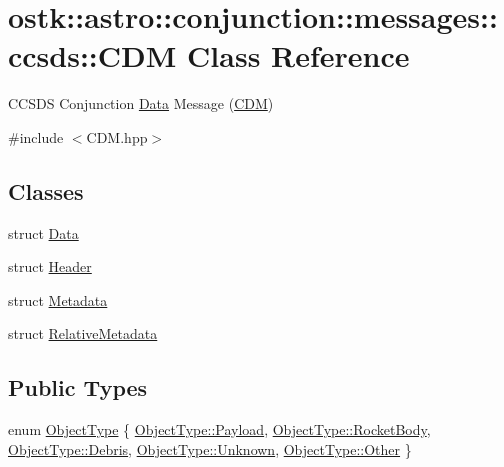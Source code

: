 \hypertarget{classostk_1_1astro_1_1conjunction_1_1messages_1_1ccsds_1_1_c_d_m}{}\section{ostk\+:\+:astro\+:\+:conjunction\+:\+:messages\+:\+:ccsds\+:\+:C\+DM Class Reference}
\label{classostk_1_1astro_1_1conjunction_1_1messages_1_1ccsds_1_1_c_d_m}


C\+C\+S\+DS Conjunction \hyperlink{structostk_1_1astro_1_1conjunction_1_1messages_1_1ccsds_1_1_c_d_m_1_1_data}{Data} Message (\hyperlink{classostk_1_1astro_1_1conjunction_1_1messages_1_1ccsds_1_1_c_d_m}{C\+DM})  




{\ttfamily \#include $<$C\+D\+M.\+hpp$>$}

\subsection*{Classes}
\begin{DoxyCompactItemize}
\item 
struct \hyperlink{structostk_1_1astro_1_1conjunction_1_1messages_1_1ccsds_1_1_c_d_m_1_1_data}{Data}
\item 
struct \hyperlink{structostk_1_1astro_1_1conjunction_1_1messages_1_1ccsds_1_1_c_d_m_1_1_header}{Header}
\item 
struct \hyperlink{structostk_1_1astro_1_1conjunction_1_1messages_1_1ccsds_1_1_c_d_m_1_1_metadata}{Metadata}
\item 
struct \hyperlink{structostk_1_1astro_1_1conjunction_1_1messages_1_1ccsds_1_1_c_d_m_1_1_relative_metadata}{Relative\+Metadata}
\end{DoxyCompactItemize}
\subsection*{Public Types}
\begin{DoxyCompactItemize}
\item 
enum \hyperlink{classostk_1_1astro_1_1conjunction_1_1messages_1_1ccsds_1_1_c_d_m_a9ef446f2327904fc0516249120ec9d71}{Object\+Type} \{ \newline
\hyperlink{classostk_1_1astro_1_1conjunction_1_1messages_1_1ccsds_1_1_c_d_m_a9ef446f2327904fc0516249120ec9d71a00f4e5788aab6d3546bb433842dbbefc}{Object\+Type\+::\+Payload}, 
\hyperlink{classostk_1_1astro_1_1conjunction_1_1messages_1_1ccsds_1_1_c_d_m_a9ef446f2327904fc0516249120ec9d71adbf0f8cc46650179a9710985f21747b4}{Object\+Type\+::\+Rocket\+Body}, 
\hyperlink{classostk_1_1astro_1_1conjunction_1_1messages_1_1ccsds_1_1_c_d_m_a9ef446f2327904fc0516249120ec9d71a7e4a693bfe182987626f234139a8dc83}{Object\+Type\+::\+Debris}, 
\hyperlink{classostk_1_1astro_1_1conjunction_1_1messages_1_1ccsds_1_1_c_d_m_a9ef446f2327904fc0516249120ec9d71a88183b946cc5f0e8c96b2e66e1c74a7e}{Object\+Type\+::\+Unknown}, 
\newline
\hyperlink{classostk_1_1astro_1_1conjunction_1_1messages_1_1ccsds_1_1_c_d_m_a9ef446f2327904fc0516249120ec9d71a6311ae17c1ee52b36e68aaf4ad066387}{Object\+Type\+::\+Other}
 \}
\end{DoxyCompactItemize}
